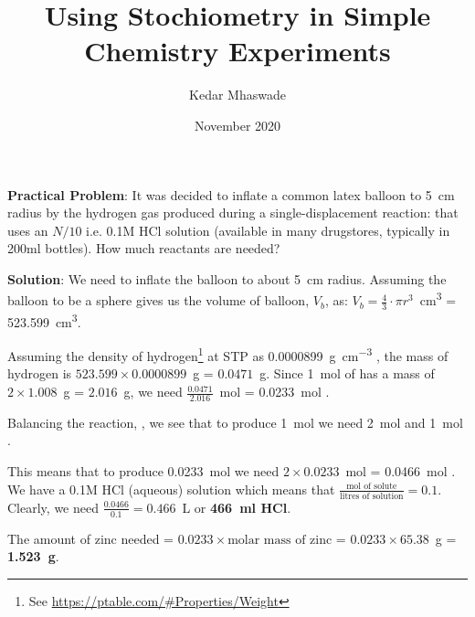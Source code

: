 \documentclass[12pt]{article}
\begin{document}
\title{Using Stochiometry in Simple Chemistry Experiments}
\author{Kedar Mhaswade}
\date{November 2020}
\maketitle
\textbf{Practical Problem}: 
It was decided to inflate a common latex balloon to 5~\si{\cm} radius by the hydrogen gas produced during a single-displacement reaction:  that uses an $N/10$ i.e. 0.1M HCl solution (available in many drugstores, typically in 200ml bottles). How much reactants are needed?

\textbf{Solution}:
We need to inflate the balloon to about 5~\si{cm} radius. Assuming the balloon to be a sphere gives us the volume of balloon, $V_b$, as:
$ V_b = {\frac{4}{3}\cdot \pi r^3}$~\si{\cubic\centi\metre} = 523.599~\si{\cubic\centi\metre}.

Assuming the density of hydrogen\footnote{See \url{https://ptable.com/\#Properties/Weight}} at STP as 0.0000899~\si{\gram\per\cubic\centi\metre} , the mass of hydrogen is $523.599\times 0.0000899$~\si{\g} = $0.0471$~\si{\gram}. Since 1~\si{\mol} of  has a mass of $2\times 1.008$~\si{\gram} = $2.016$~\si{\gram}, we need 
$\frac{0.0471}{2.016}$~\si{\mol} = 0.0233~\si{\mol} .

Balancing the reaction, 
, 
we see that to produce 1~\si{\mol}  we need 2~\si{\mol}  and 1~\si{\mol} .

This means that to produce 0.0233~\si{\mol}  we need $2\times0.0233$~\si{\mol} = 0.0466~\si{\mol} . We have a 0.1M HCl (aqueous) solution which means that $\frac{\text{mol of solute}}{\text{litres of solution}} = 0.1$. Clearly, we need $\frac{0.0466}{0.1} = 0.466$~\si{L} or \textbf{466~\si{ml} HCl}.

The amount of zinc needed = $0.0233\times\text{molar mass of zinc}$ = $0.0233\times 65.38$~\si{g} = \textbf{1.523~\si{g}}.

\let\thefootnote\relax{}
\let\thefootnote\relax{}
\end{document}
